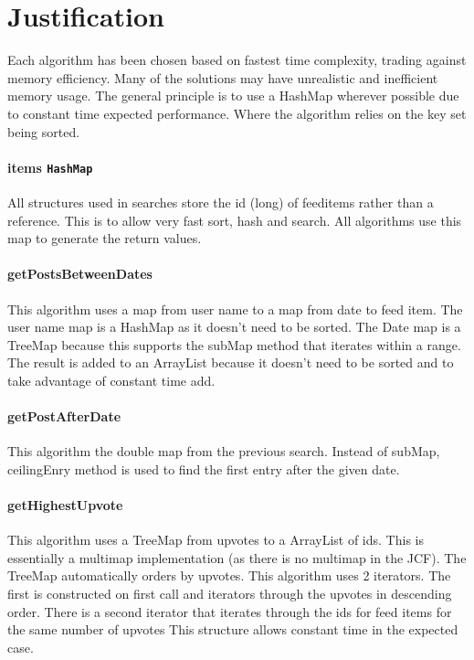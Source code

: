 \documentclass[11pt, oneside]{article}   	%
\begin{document}
\section{Justification}

Each algorithm has been chosen based on fastest time complexity, trading against memory efficiency. Many of the solutions may have unrealistic and inefficient memory usage. The general principle is to use a HashMap wherever possible due to constant time expected performance. Where the algorithm relies on the key set being sorted. 

\paragraph{items \texttt{HashMap}}

All structures used in searches store the id (long) of feeditems rather than a reference. This is to allow very fast sort, hash and search. All algorithms use this map to generate the return values. 

\paragraph{getPostsBetweenDates}

This algorithm uses a map from user name to a map from date to feed item. The user name map is a HashMap as it doesn't need to be sorted. The Date map is a TreeMap because this supports the subMap method that iterates within a range. The result is added to an ArrayList because it doesn't need to be sorted and to take advantage of constant time add.

\paragraph{getPostAfterDate}

This algorithm the double map from the previous search. Instead of subMap, ceilingEnry method is used to find the first entry after the given date.

\paragraph{getHighestUpvote}

This algorithm uses a TreeMap from upvotes to a ArrayList of ids. This is essentially a multimap implementation (as there is no multimap in the JCF). The TreeMap automatically orders by upvotes. This algorithm uses 2 iterators. The first is constructed on first call and iterators through the upvotes in descending order. There is a second iterator that iterates through the ids for feed items for the same number of upvotes This structure allows constant time in the expected case.
\end{document}
